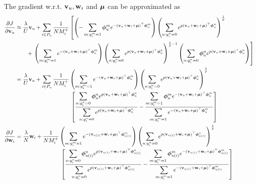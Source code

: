 The gradient w.r.t. $\mathbf{v}_u, \mathbf{w}_i$ and $\bm{\mu}$ can be approximated as 
\begin{equation*}
\begin{aligned}
\frac{\partial J}{\partial \bv_u}
&\approx \frac{\lambda}{U} \bv_u
  + \sum_{i \in P_u} \frac{1}{N M_i^+} \left[
    \left(-\sum_{m: y_i^m = 1} \phibm_u^m e^{-(\bv_u + \w_i + \mubm)^\top \phibm_u^m} \right)
    \left( \sum_{n: y_i^n = 0} e^{p (\bv_u + \w_i + \mubm)^\top \phibm_u^n} \right)^\frac{1}{p} \right. \\
& \hspace{2em} + \left.
    \left( \sum_{m: y_i^m = 1} e^{-(\bv_u + \w_i + \mubm)^\top \phibm_u^m} \right)
    \left( \sum_{n: y_i^n = 0} e^{p (\bv_u + \w_i + \mubm)^\top \phibm_u^n} \right)^{\frac{1}{p} - 1}
    \left( \sum_{n: y_i^n = 0} \phibm_u^n e^{p (\bv_u + \w_i + \mubm)^\top \phibm_u^n} \right) \right] \\
&= \frac{\lambda}{U} \bv_u
  + \sum_{i \in P_u} \frac{1}{N M_i^+} 
    \left( \sum_{m: y_i^m = 1} e^{-(\bv_u + \w_i + \mubm)^\top \phibm_u^m} \right)
    \left( \sum_{n: y_i^n = 0} e^{p (\bv_u + \w_i + \mubm)^\top \phibm_u^n} \right)^\frac{1}{p} \\
& \hspace{9.8em} \left[ 
    \frac{ \displaystyle \sum_{n: y_i^n = 0} \phibm_u^n e^{p (\bv_u + \w_i + \mubm)^\top \phibm_u^n} }
         { \displaystyle \sum_{n: y_i^n = 0} e^{p (\bv_u + \w_i + \mubm)^\top \phibm_u^n} }
    - \frac{ \displaystyle \sum_{m: y_i^m = 1} \phibm_u^m e^{-(\bv_u + \w_i + \mubm)^\top \phibm_u^m} }
           { \displaystyle \sum_{m: y_i^m = 1} e^{-(\bv_u + \w_i + \mubm)^\top \phibm_u^m} } \right] \\
%
\frac{\partial J}{\partial \w_i}
&= \frac{\lambda}{N} \w_i
  + \frac{1}{N M_i^+} 
    \left( \sum_{m: y_i^m = 1} e^{-(\bv_{u(i)} + \w_i + \mubm)^\top \phibm_{u(i)}^m} \right)
    \left( \sum_{n: y_i^n = 0} e^{p (\bv_{u(i)} + \w_i + \mubm)^\top \phibm_{u(i)}^n} \right)^\frac{1}{p} \\
& \hspace{8em} \left[ 
    \frac{ \displaystyle \sum_{n: y_i^n = 0} \phibm_{u(i)}^n e^{p (\bv_{u(i)} + \w_i + \mubm)^\top \phibm_{u(i)}^n} }
         { \displaystyle \sum_{n: y_i^n = 0} e^{p (\bv_{u(i)} + \w_i + \mubm)^\top \phibm_{u(i)}^n} }
    - \frac{ \displaystyle \sum_{m: y_i^m = 1} \phibm_{u(i)}^m e^{-(\bv_{u(i)} + \w_i + \mubm)^\top \phibm_{u(i)}^m} }
           { \displaystyle \sum_{m: y_i^m = 1} e^{-(\bv_{u(i)} + \w_i + \mubm)^\top \phibm_{u(i)}^m} } \right] \\

\end{aligned}
\end{equation*}
